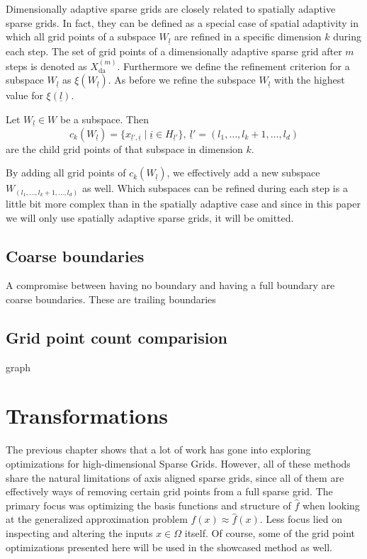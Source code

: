 \documentclass[
  a4paper,  %
  twoside,  %
  bibliography=totoc,
  headsepline,
  cleardoublepage=empty,
  parskip=half,
  draft=false
]{scrbook}
\begin{document}
Dimensionally adaptive sparse grids are closely related to spatially adaptive sparse grids.
In fact, they can be defined as a special case of spatial adaptivity in which all grid points of a subspace $W_{\underline{l}}$ are refined in a specific dimension $k$ during each step.
The set of grid points of a dimensionally adaptive sparse grid after $m$ steps is denoted as $X_{\text{da}}^{(m)}$.
Furthermore we define the refinement criterion for a subspace $W_{\underline{l}}$ as $\xi(W_{\underline{l}})$.
As before we refine the subspace $W_{\underline{l}}$ with the highest value for $\xi(\underline{l})$.
\begin{definition}
Let $W_{\underline{l}} \in W$ be a subspace. Then
\begin{equation}
c_k(W_{\underline{l}})=\{x_{\underline{l}',\underline{i}} \mid \underline{i} \in H_{\underline{l}'} \}, ~ \underline{l}'=(l_1, \dots, l_k + 1, \dots, l_d)
\end{equation}
are the child grid points of that subspace in dimension $k$.
\end{definition}
By adding all grid points of $c_k(W_{\underline{l}})$, we effectively add a new subspace $W_{(l_1, \dots, l_k + 1, \dots, l_d)}$ as well.
Which subspaces can be refined during each step is a little bit more complex than in the spatially adaptive case and since in this paper we will only use spatially adaptive sparse grids, it will be omitted.

\section{Coarse boundaries}

A compromise between having no boundary and having a full boundary are coarse boundaries.
These are trailing boundaries

\section{Grid point count comparision}

graph

\chapter{Transformations}

The previous chapter shows that a lot of work has gone into exploring optimizations for high-dimensional Sparse Grids.
However, all of these methods share the natural limitations of axis aligned sparse grids, since all of them are effectively ways of removing certain grid points from a full sparse grid.
The primary focus was optimizing the basis functions and structure of $\hat{f}$ when looking at the generalized approximation problem $f(x) \approx \hat{f}(x)$.
Less focus lied on inspecting and altering the inputs $x \in \Omega$ itself.
Of course, some of the grid point optimizations presented here will be used in the showcased method as well.
\end{document}
